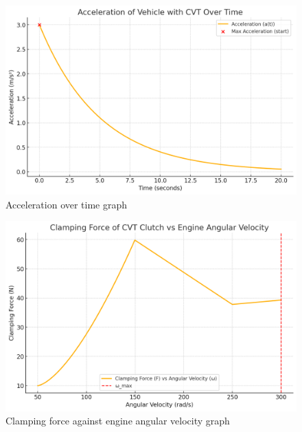 \documentclass[12pt, titlepage]{article}
\begin{document}
\begin{figure}[H]
  \centering
  \includegraphics[width=\textwidth]{graphs/acceleration.png}
  \caption{Acceleration over time graph}
  \label{fig:acceleration_graph}
\end{figure}

\begin{figure}[H]
  \centering
  \includegraphics[width=\textwidth]{graphs/clamp_force.png}
  \caption{Clamping force against engine angular velocity graph}
  \label{fig:clamping_force_graph}
\end{figure}
\end{document}
